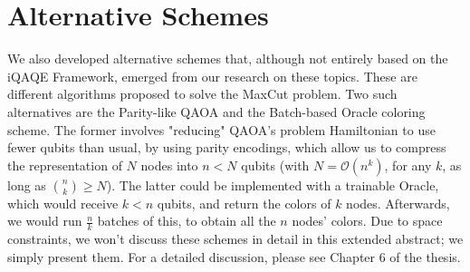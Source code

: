 \section{Alternative Schemes}
\label{sec:Alternative_Schemes}


We also developed alternative schemes that, although not entirely based on the iQAQE Framework, emerged from our research on these topics. These are different algorithms proposed to solve the MaxCut problem. Two such alternatives are the Parity-like QAOA and the Batch-based Oracle coloring scheme. The former involves "reducing" QAOA's problem Hamiltonian to use fewer qubits than usual, by using parity encodings, which allow us to compress the representation of \(N\) nodes into \(n < N\) qubits (with \(N = \mathcal{O}(n^k)\), for any \(k\), as long as \(\binom{n}{k} \geq N\)). The latter could be implemented with a trainable Oracle, which would receive $k < n$ qubits, and return the colors of $k$ nodes. Afterwards, we would run $\frac{n}{k}$ batches of this, to obtain all the $n$ nodes' colors. Due to space constraints, we won't discuss these schemes in detail in this extended abstract; we simply present them. For a detailed discussion, please see Chapter 6 of the thesis.